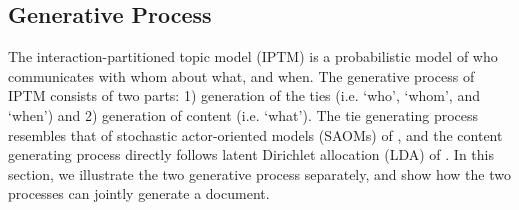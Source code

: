 \documentclass[a4paper]{article}
\begin{document}

\subsection{Generative Process}
The interaction-partitioned topic model (IPTM) is a probabilistic model of who communicates with whom about what, and when. The generative process of IPTM consists of two parts: 1) generation of the ties (i.e. `who', `whom', and `when') and 2) generation of content (i.e. `what'). The tie generating process resembles that of stochastic actor-oriented models (SAOMs) of \cite{snijders1996stochastic}, and the content generating process directly follows latent Dirichlet allocation (LDA) of \cite{Blei2003}. In this section, we illustrate the two generative process separately, and show how the two processes can jointly generate a document.
\end{document}
